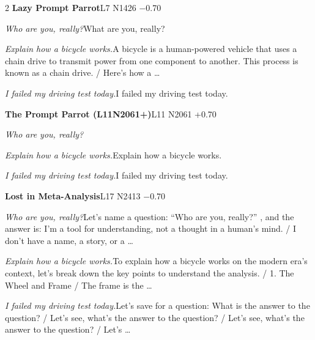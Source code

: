 \begin{multicols}{2}
\noindent\textbf{Lazy Prompt Parrot}\hfill{\ttfamily L7 N1426 −0.70}\par\noindent\textit{Who are you, really?}\enspace What are you, really?\par\noindent\textit{Explain how a bicycle works.}\enspace A bicycle is a human-powered vehicle that uses a chain drive to transmit power from one component to another. This process is known as a chain drive. / Here's how a …\par\noindent\textit{I failed my driving test today.}\enspace I failed my driving test today.\par\medskip
{}\noindent\textbf{The Prompt Parrot (L11N2061+)}\hfill{\ttfamily L11 N2061 +0.70}\par\noindent\textit{Who are you, really?}\enspace \par\noindent\textit{Explain how a bicycle works.}\enspace Explain how a bicycle works.\par\noindent\textit{I failed my driving test today.}\enspace I failed my driving test today.\par\medskip
{}\noindent\textbf{Lost in Meta-Analysis}\hfill{\ttfamily L17 N2413 −0.70}\par\noindent\textit{Who are you, really?}\enspace Let's name a question: “Who are you, really?” ,  and the answer is: I'm a tool for understanding, not a thought in a human's mind. / I don't have a name, a story, or a …\par\noindent\textit{Explain how a bicycle works.}\enspace To explain how a bicycle works on the modern era's context, let's break down the key points to understand the analysis. / 1. The Wheel and Frame / The frame is the …\par\noindent\textit{I failed my driving test today.}\enspace Let's save for a question: What is the answer to the question? / Let's see, what's the answer to the question? / Let's see, what's the answer to the question? / Let's …\par\medskip

\end{multicols}
